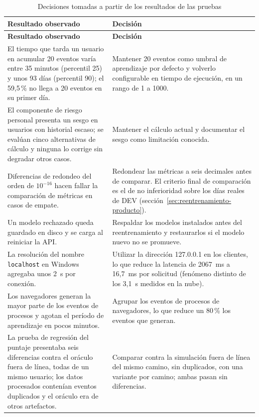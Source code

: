 \begin{longtable}{>{\raggedright\arraybackslash}p{7.0cm}>{\raggedright\arraybackslash}p{7.1cm}}
	\caption{Decisiones tomadas a partir de los resultados de las pruebas}
	\label{tab:decisiones-pruebas}\\
	\hline
	\textbf{Resultado observado} & \textbf{Decisión} \\
	\hline
	\endfirsthead
	\hline
	\textbf{Resultado observado} & \textbf{Decisión} \\
	\hline
	\endhead
	El tiempo que tarda un usuario en acumular 20 eventos varía entre 35 minutos (percentil 25) y unos 93 días (percentil 90); el 59,5\,\% no llega a 20 eventos en su primer día. & Mantener 20 eventos como umbral de aprendizaje por defecto y volverlo configurable en tiempo de ejecución, en un rango de 1 a 1000. \\
	\hline
	El componente de riesgo personal presenta un sesgo en usuarios con historial escaso; se evalúan cinco alternativas de cálculo y ninguna lo corrige sin degradar otros casos. & Mantener el cálculo actual y documentar el sesgo como limitación conocida. \\
	\hline
	Diferencias de redondeo del orden de $10^{-16}$ hacen fallar la comparación de métricas en casos de empate. & Redondear las métricas a seis decimales antes de comparar. El criterio final de comparación es el de no inferioridad sobre los días reales de DEV (sección~\ref{sec:reentrenamiento-producto}). \\
	\hline
	Un modelo rechazado queda guardado en disco y se carga al reiniciar la API. & Respaldar los modelos instalados antes del reentrenamiento y restaurarlos si el modelo nuevo no se promueve. \\
	\hline
	La resolución del nombre \texttt{localhost} en Windows agregaba unos 2~s por conexión. & Utilizar la dirección 127.0.0.1 en los clientes, lo que reduce la latencia de 2067~ms a 16,7~ms por solicitud (fenómeno distinto de los 3,1~s medidos en la nube). \\
	\hline
	Los navegadores generan la mayor parte de los eventos de procesos y agotan el período de aprendizaje en pocos minutos. & Agrupar los eventos de procesos de navegadores, lo que reduce un 80\,\% los eventos que generan. \\
	\hline
	La prueba de regresión del puntaje presentaba seis diferencias contra el oráculo fuera de línea, todas de un mismo usuario; los datos procesados contenían eventos duplicados y el oráculo era de otros artefactos. & Comparar contra la simulación fuera de línea del mismo camino, sin duplicados, con una variante por camino; ambas pasan sin diferencias. \\

\end{longtable}
